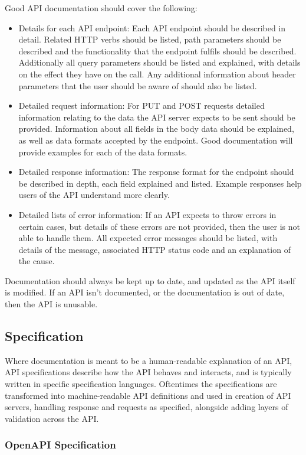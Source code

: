 Good API documentation should cover the following:
\begin{itemize}
    \item Details for each API endpoint: Each API endpoint should be described in detail. Related HTTP verbs should be listed, path parameters should be described and the functionality that the endpoint fulfils should be described. Additionally all query parameters should be listed and explained, with details on the effect they have on the call. Any additional information about header parameters that the user should be aware of should also be listed.
    \item Detailed request information: For PUT and POST requests detailed information relating to the data the API server expects to be sent should be provided. Information about all fields in the body data should be explained, as well as data formats accepted by the endpoint. Good documentation will provide examples for each of the data formats.
    \item Detailed response information: The response format for the endpoint should be described in depth, each field explained and listed. Example responses help users of the API understand more clearly. 
    \item Detailed lists of error information: If an API expects to throw errors in certain cases, but details of these errors are not provided, then the user is not able to handle them. All expected error messages should be listed, with details of the message, associated HTTP status code and an explanation of the cause. 
\end{itemize}
Documentation should always be kept up to date, and updated as the API itself is modified. If an API isn't documented, or the documentation is out of date, then the API is unusable.

\subsection{Specification}
Where documentation is meant to be a human-readable explanation of an API, API specifications describe how the API behaves and interacts, and is typically written in specific specification languages. Oftentimes the specifications are transformed into machine-readable API definitions and used in creation of API servers, handling response and requests as specified, alongside adding layers of validation across the API.

\subsubsection{OpenAPI Specification}

